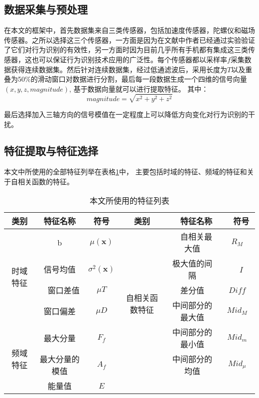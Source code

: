 \subsection{数据采集与预处理}
\par 在本文的框架中，首先数据集来自三类传感器，包括加速度传感器，陀螺仪和磁场传感器。之所以选择这三个传感器，一方面是因为在文献中\cite{diffSensors}作者已经通过实验验证了它们对行为识别的有效性，另一方面时因为目前几乎所有手机都有集成这三类传感器，这也可以保证行为识别技术应用的广泛性。每个传感器都以采样率$f$采集数据获得连续数据集。然后针对连续数据集，经过低通滤波后，采用长度为$T$以及重叠为50\%的滑动窗口对数据进行分割，最后每一段数据生成一个四维的信号向量$(x, y, z, magnitude)$, 基于数据向量就可以进行提取特征。 其中：
\begin{equation}
	magnitude = \sqrt{x^2+y^2+z^2}
\end{equation}
\par 最后选择加入三轴方向的信号模值在一定程度上可以降低方向变化对行为识别的干扰。

\subsection{特征提取与特征选择}
本文中所使用的全部特征列举在表格\ref{feature_list}中， 主要包括时域的特征、频域的特征和关于自相关函数的特征。

\begin{table}[!hbp]
    \caption{本文所使用的特征列表} \label{feature_list}
    \begin{tabular}{|c|c|c|c|c|c|}
    \hline
    类别 & 特征名称 & 符号 & 类别 &　特征名称　&　符号　\\
    \hline
    \multirow{4}{*}{时域特征} & b　& $\mu (\textbf{x})$ & \multirow{6}{*}{自相关函数特征}　&　自相关最大值 & $R_M$ \\
    \cline{2-3} \cline{5-6}
    & 信号均值　& $\sigma ^2 (\textbf{x})$ & & 极大值的间隔　&　$I$  \\
    \cline{2-3} \cline{5-6}
    &　窗口差值 & $\mu T$ & & 差分值 & $Diff$ \\
    \cline{2-3} \cline{5-6}
    & 窗口偏差 & $\mu D$ & & 中间部分的最大值 & $Mid_M$ \\
    \cline{1-3} \cline{5-6}
    \multirow{3}{*}{频域特征} & 最大分量 & $F_f$ & & 中间部分的最小值 & $Mid_m$ \\
    \cline{2-3} \cline{5-6}
    & 最大分量的模值 & $A_f$ & & 中间部分的均值 & $Mid_{\mu}$ \\
    \cline{2-6}
    & 能量值 & $E$ & & & \\
    \hline
    \end{tabular}
\end{table}


